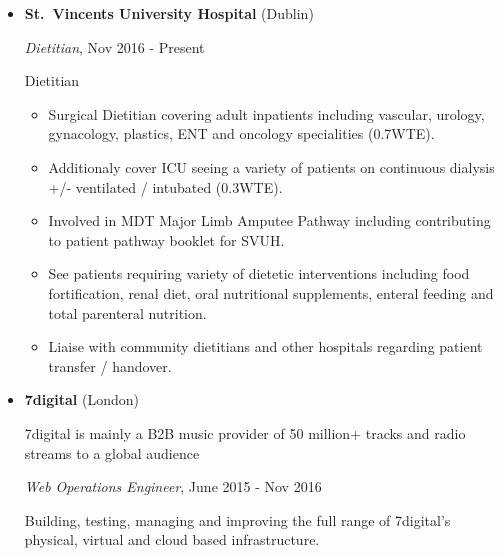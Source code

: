 \documentclass[]{article}
\providecommand{\tightlist}{%
  \setlength{\itemsep}{0pt}\setlength{\parskip}{0pt}}
\begin{document}
\begin{itemize}
\item
  \textbf{St.~Vincents University Hospital} (Dublin)

  \emph{Dietitian}, Nov 2016 - Present

  Dietitian

  \begin{itemize}
  \tightlist
  \item
    Surgical Dietitian covering adult inpatients including vascular,
    urology, gynacology, plastics, ENT and oncology specialities
    (0.7WTE).
  \item
    Additionaly cover ICU seeing a variety of patients on continuous
    dialysis +/- ventilated / intubated (0.3WTE).
  \item
    Involved in MDT Major Limb Amputee Pathway including contributing to
    patient pathway booklet for SVUH.
  \item
    See patients requiring variety of dietetic interventions including
    food fortification, renal diet, oral nutritional supplements,
    enteral feeding and total parenteral nutrition.
  \item
    Liaise with community dietitians and other hospitals regarding
    patient transfer / handover.
  \end{itemize}
\item
  \textbf{7digital} (London)

  7digital is mainly a B2B music provider of 50 million+ tracks and
  radio streams to a global audience

  \emph{Web Operations Engineer}, June 2015 - Nov 2016

  Building, testing, managing and improving the full range of 7digital's
  physical, virtual and cloud based infrastructure.


\end{itemize}
\end{document}
